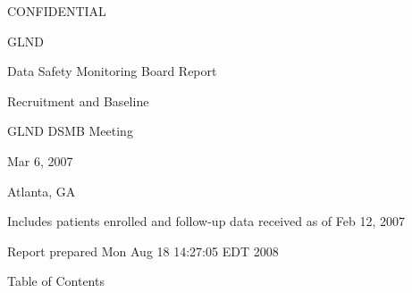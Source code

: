 \documentclass[dvips,10pt]{article}
\begin{document}
\vspace*{1in}
\begin{center}
{\Huge{CONFIDENTIAL}}
\end{center}
\vspace*{0.5in}
\begin{center}
{\Huge{GLND}}
\end{center}
\vspace*{0.5in}
\begin{center}
{\Huge{Data Safety Monitoring Board Report}}
\end{center}
\vspace*{0.25in}
\begin{center}
{\Huge{
Recruitment and Baseline
}}
\end{center}
\vspace*{1in}
\begin{center}
{\Huge{GLND DSMB Meeting}}
\end{center}
\begin{center}
{\Huge{
Mar 6, 2007
}}
\end{center}
\begin{center}
{\Huge{Atlanta, GA}}
\end{center}
\vspace*{1in}
\begin{center}
\noindent
{\Large{Includes patients enrolled and follow-up data received as of Feb 12, 2007}}
\end{center}
\vspace*{0.5in}
\begin{center}
{\Large{Report prepared  Mon Aug 18 14:27:05 EDT 2008 }}
\end{center}
\clearpage
\vspace*{1in}
\begin{center}
{\Huge{Table of Contents}}
\end{center}
\listoftables
\listoffigures
\clearpage
\end{document}

